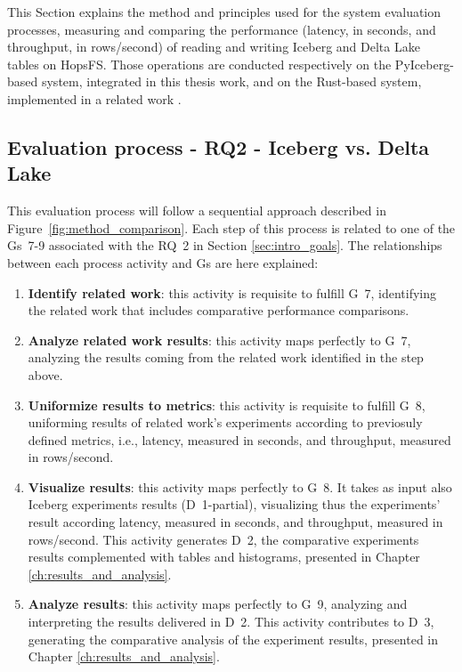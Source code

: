 This Section explains the method and principles used for the system evaluation processes, measuring and comparing the performance (latency, in seconds, and throughput, in rows/second) of reading and writing Iceberg and Delta Lake tables on \gls{HopsFS}. Those operations are conducted respectively on the PyIceberg-based system, integrated in this thesis work, and on the Rust-based system, implemented in a related work \cite{manfrediReducingReadWrite2024}.

\subsection{Evaluation process - RQ2 - Iceberg vs. Delta Lake}
\label{subsec:eval_process_iceberg_delta}
This evaluation process will follow a sequential approach described in Figure~\ref{fig:method_comparison}. Each step of this process is related to one of the \glspl{G}~7-9 associated with the \gls{RQ}~2 in Section \ref{sec:intro_goals}. The relationships between each process activity and \glspl{G} are here explained:
\begin{enumerate}
    \item \textbf{Identify related work}: this activity is requisite to fulfill \gls{G}~7, identifying the related work that includes comparative performance comparisons.
    \item \textbf{Analyze related work results}: this activity maps perfectly to \gls{G}~7, analyzing the results coming from the related work identified in the step above.
    \item \textbf{Uniformize results to metrics}: this activity is requisite to fulfill \gls{G}~8, uniforming results of related work's experiments according to previosuly defined metrics, i.e., latency, measured in seconds, and throughput, measured  in rows/second.
    \item \textbf{Visualize results}: this activity maps perfectly to \gls{G}~8. It takes as input also Iceberg experiments results (\gls{D}~1-partial), visualizing thus the experiments' result according latency, measured in seconds, and throughput, measured in rows/second. This activity generates \gls{D}~2, the comparative experiments results complemented with tables and histograms, presented in Chapter \ref{ch:results_and_analysis}.
    \item \textbf{Analyze results}: this activity maps perfectly to \gls{G}~9, analyzing and interpreting the results delivered in \gls{D}~2. This activity contributes to \gls{D}~3, generating the comparative analysis of the experiment results, presented in Chapter \ref{ch:results_and_analysis}.
\end{enumerate}
